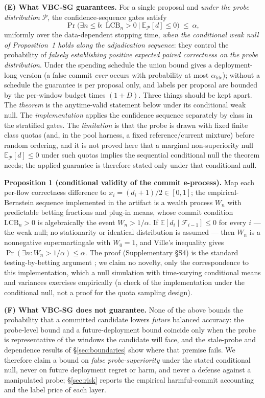 \documentclass[a4paper,fleqn]{cas-sc}
\begin{document}
\textbf{(E) What VBC-SG guarantees.} For a single proposal and \emph{under the probe distribution} $\mathcal P$, the confidence-sequence gates satisfy
$$\Pr\!\big(\exists n\le b:\ \text{LCB}_n>0 \ \big|\ \mathbb E_{\mathcal P}[d]\le 0\big)\ \le\ \alpha ,$$
uniformly over the data-dependent stopping time, \emph{when the conditional weak null of Proposition~1 holds along the adjudication sequence}: they control the probability of \emph{falsely establishing positive expected paired correctness on the probe distribution}. Under the spending schedule the union bound gives a deployment-long version (a false commit \emph{ever} occurs with probability at most $\alpha_{\mathrm{life}}$); without a schedule the guarantee is per proposal only, and labels per proposal are bounded by the per-window budget times $(1+D)$. Three things should be kept apart. The \emph{theorem} is the anytime-valid statement below under its conditional weak null. The \emph{implementation} applies the confidence sequence separately by class in the stratified gates. The \emph{limitation} is that the probe is drawn with fixed finite class quotas (and, in the pool harness, a fixed reference/current mixture) before random ordering, and it is not proved here that a marginal non-superiority null $\mathbb E_{\mathcal P}[d]\le 0$ under such quotas implies the sequential conditional null the theorem needs; the applied guarantee is therefore stated only under that conditional null.

\textbf{Proposition 1 (conditional validity of the commit e-process).} Map each per-flow correctness difference to $x_i = (d_i+1)/2 \in [0,1]$; the empirical-Bernstein sequence implemented in the artifact is a wealth process $W_n$ with predictable betting fractions and plug-in means, whose commit condition $\mathrm{LCB}_n > 0$ is algebraically the event $W_n > 1/\alpha$. If $\mathbb{E}[d_i \mid \mathcal F_{i-1}] \le 0$ for every $i$ --- the weak null; no stationarity or identical distribution is assumed --- then $W_n$ is a nonnegative supermartingale with $W_0 = 1$, and Ville's inequality gives $\Pr(\exists n : W_n > 1/\alpha) \le \alpha$. The proof (Supplementary \S S4) is the standard testing-by-betting argument \cite{waudbysmith2023betting,howard2021timeuniform}; we claim no novelty, only the correspondence to this implementation, which a null simulation with time-varying conditional means and variances exercises empirically (a check of the implementation under the conditional null, not a proof for the quota sampling design).

\textbf{(F) What VBC-SG does not guarantee.} None of the above bounds the probability that a committed candidate lowers \emph{future} balanced accuracy: the probe-level bound and a future-deployment bound coincide only when the probe is representative of the windows the candidate will face, and the stale-probe and dependence results of \S\ref{sec:boundaries} show where that premise fails. We therefore claim a bound on \emph{false probe-superiority} under the stated conditional null, never on future deployment regret or harm, and never a defense against a manipulated probe; \S\ref{sec:risk} reports the empirical harmful-commit accounting and the label price of each layer.
\end{document}
